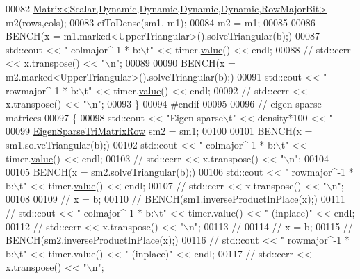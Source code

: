 \begin{DoxyCode}
{00082       \hyperlink{group___core___module_class_eigen_1_1_matrix}{Matrix<Scalar,Dynamic,Dynamic,Dynamic,Dynamic,RowMajorBit>}
       m2(rows,cols);
00083       eiToDense(sm1, m1);
00084       m2 = m1;
00085 
00086       BENCH(x = m1.marked<UpperTriangular>().solveTriangular(b);)
00087       std::cout << \textcolor{stringliteral}{"   colmajor^-1 * b:\(\backslash\)t"} << timer.\hyperlink{class_eigen_1_1_bench_timer_a26760f963ed8b64c126159bfea57735e}{value}() << endl;
00088 \textcolor{comment}{//       std::cerr << x.transpose() << "\(\backslash\)n";}
00089 
00090       BENCH(x = m2.marked<UpperTriangular>().solveTriangular(b);)
00091       std::cout << \textcolor{stringliteral}{"   rowmajor^-1 * b:\(\backslash\)t"} << timer.\hyperlink{class_eigen_1_1_bench_timer_a26760f963ed8b64c126159bfea57735e}{value}() << endl;
00092 \textcolor{comment}{//       std::cerr << x.transpose() << "\(\backslash\)n";}
00093     \}
00094 \textcolor{preprocessor}{    #endif}
00095 
00096     \textcolor{comment}{// eigen sparse matrices}
00097     \{
00098       std::cout << \textcolor{stringliteral}{"Eigen sparse\(\backslash\)t"} << density*100 << \textcolor{stringliteral}{"%
00099       \hyperlink{group___sparse_core___module_class_eigen_1_1_sparse_matrix}{EigenSparseTriMatrixRow} sm2 = sm1;
00100 
00101       BENCH(x = sm1.solveTriangular(b);)
00102       std::cout << \textcolor{stringliteral}{"   colmajor^-1 * b:\(\backslash\)t"} << timer.\hyperlink{class_eigen_1_1_bench_timer_a26760f963ed8b64c126159bfea57735e}{value}() << endl;
00103 \textcolor{comment}{//       std::cerr << x.transpose() << "\(\backslash\)n";}
00104 
00105       BENCH(x = sm2.solveTriangular(b);)
00106       std::cout << \textcolor{stringliteral}{"   rowmajor^-1 * b:\(\backslash\)t"} << timer.\hyperlink{class_eigen_1_1_bench_timer_a26760f963ed8b64c126159bfea57735e}{value}() << endl;
00107 \textcolor{comment}{//       std::cerr << x.transpose() << "\(\backslash\)n";}
00108 
00109 \textcolor{comment}{//       x = b;}
00110 \textcolor{comment}{//       BENCH(sm1.inverseProductInPlace(x);)}
00111 \textcolor{comment}{//       std::cout << "   colmajor^-1 * b:\(\backslash\)t" << timer.value() << " (inplace)" << endl;}
00112 \textcolor{comment}{//       std::cerr << x.transpose() << "\(\backslash\)n";}
00113 \textcolor{comment}{//}
00114 \textcolor{comment}{//       x = b;}
00115 \textcolor{comment}{//       BENCH(sm2.inverseProductInPlace(x);)}
00116 \textcolor{comment}{//       std::cout << "   rowmajor^-1 * b:\(\backslash\)t" << timer.value() << " (inplace)" << endl;}
00117 \textcolor{comment}{//       std::cerr << x.transpose() << "\(\backslash\)n";}
}}
\end{DoxyCode}
